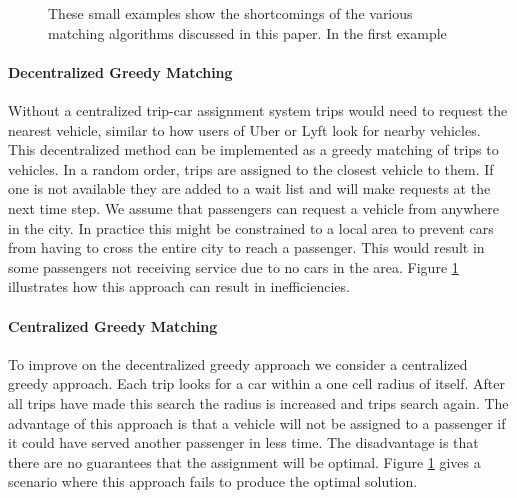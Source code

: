 \documentclass[letterpaper]{article}
\begin{document}
\begin{figure}


\hspace{2mm}
\label{exampleFigure}
\caption{These small examples show the shortcomings of the various matching algorithms discussed in this paper. In the first example}
\end{figure}

\paragraph{Decentralized Greedy Matching}
Without a centralized trip-car assignment system trips would need to request the nearest vehicle, similar to how users of Uber or Lyft look for nearby vehicles. This decentralized method can be implemented as a greedy matching of trips to vehicles. In a random order, trips are assigned to the closest vehicle to them. If one is not available they are added to a wait list and will make requests at the next time step. We assume that passengers can request a vehicle from anywhere in the city. In practice this might be constrained to a local area to prevent cars from having to cross the entire city to reach a passenger. This would result in some passengers not receiving service due to no cars in the area. Figure \ref{exampleFigure} illustrates how this approach can result in inefficiencies.


\paragraph{Centralized Greedy Matching}
To improve on the decentralized greedy approach we consider a centralized greedy approach. Each trip looks for a car within a one cell radius of itself. After all trips have made this search the radius is increased and trips search again. The advantage of this approach is that a vehicle will not be assigned to a passenger if it could have served another passenger in less time. The disadvantage is that there are no guarantees that the assignment will be optimal. Figure \ref{exampleFigure} gives a scenario where this approach fails to produce the optimal solution.
\end{document}
